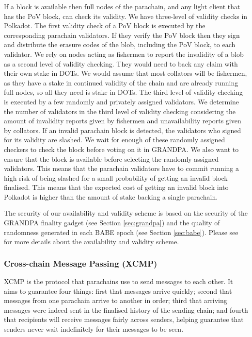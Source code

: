 \documentclass{article}
\begin{document}
If a block is available then full nodes of the parachain, and any light client that has the PoV block, can check its validity. We have three-level of validity checks in Polkadot. The first validity check of a PoV block is executed by the corresponding parachain validators. If they verify the PoV block then they sign and distribute the erasure codes of the blob, including the PoV block, to each validator.
We rely on nodes acting as fishermen to report the invalidity of a blob as  a second level of validity checking. They would need to back any claim with their own stake in DOTs. We would assume that most collators will be fishermen, as they have a stake in continued validity of the chain and are already running full nodes, so all they need is stake in DOTs. The third level of validity checking is executed by a few randomly and privately assigned validators. We determine the number of validators in the third level of validity checking considering the amount of invalidity reports given by fishermen and unavailability reports given by  collators. If an invalid parachain block is detected, the validators who signed for its validity are slashed.
We wait for enough of these randomly assigned checkers to check the block before voting on it in GRANDPA. We also  want to ensure that the block is available before selecting the randomly assigned validators. This means that the parachain validators have to commit running a high risk of being slashed for a small probability of getting an invalid block finalised. This means that the expected cost of getting an invalid block into Polkadot is higher than the amount of stake backing a single parachain.

The security of our availability and validity scheme is based on the security of the GRANDPA finality gadget (see Section \ref{sec:grandpa}) and the quality of randomness generated in each BABE epoch (see Section \ref{sec:babe}). Please see \cite{availandvalid} for more details about the availability and validity scheme.


\subsubsection{Cross-chain Message Passing (XCMP)} \label{sec:XCMP}
XCMP is the protocol that parachains use to send messages to each other.
It aims to guarantee four things: first that messages arrive quickly; second that messages from one parachain arrive to another in order; third that arriving messages were indeed sent in the finalised history of the sending chain; and fourth that recipients will receive messages fairly across senders, helping guarantee that senders never wait indefinitely for their messages to be seen.
\end{document}
